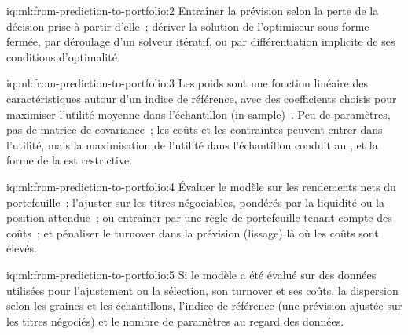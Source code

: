 \begin{solution}{iq:ml:from-prediction-to-portfolio:2}
Entraîner la prévision selon la perte de la décision prise à partir d'elle~; dériver la solution de l'optimiseur sous forme fermée, par
déroulage d'un solveur itératif, ou par différentiation implicite de ses conditions d'optimalité.
\end{solution}

\begin{solution}{iq:ml:from-prediction-to-portfolio:3}
Les poids sont une fonction linéaire des caractéristiques autour d'un indice de référence, avec des coefficients choisis pour maximiser l'utilité moyenne
dans l'échantillon (in-sample)~. Peu de paramètres, pas de matrice de covariance~; les coûts et les contraintes peuvent entrer dans l'utilité, mais la maximisation
de l'utilité dans l'échantillon conduit au , et la forme de la  est restrictive.
\end{solution}

\begin{solution}{iq:ml:from-prediction-to-portfolio:4}
Évaluer le modèle sur les rendements nets du portefeuille~; l'ajuster sur les titres négociables, pondérés par la liquidité ou la position attendue~; ou entraîner
par une règle de portefeuille tenant compte des coûts~; et pénaliser le turnover dans la prévision (lissage) là où les coûts sont élevés.
\end{solution}

\begin{solution}{iq:ml:from-prediction-to-portfolio:5}
Si le modèle a été évalué sur des données utilisées pour l'ajustement ou la sélection, son turnover et ses coûts, la dispersion selon les graines et les échantillons,
l'indice de référence (une prévision ajustée sur les titres négociés) et le nombre de paramètres au regard des données.
\end{solution}

